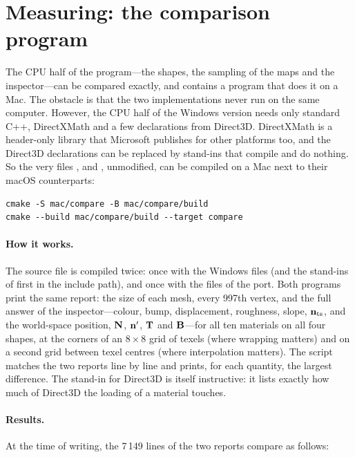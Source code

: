 \section{Measuring: the comparison program}
\label{sec:probe}
The CPU half of the program---the shapes, the sampling of the maps and the inspector---can be
compared exactly, and  contains a program that does it on a Mac. The obstacle
is that the two implementations never run on the same computer. However, the CPU half of the
Windows version needs only standard C++, DirectXMath and a few declarations from Direct3D.
DirectXMath is a header-only library that Microsoft publishes for other platforms too, and the
Direct3D declarations can be replaced by stand-ins that compile and do nothing. So the very files
,  and , unmodified, can be
compiled on a Mac next to their macOS counterparts:
\begin{lstlisting}[language={},numbers=none,frame=none,basicstyle=\ttfamily\small]
cmake -S mac/compare -B mac/compare/build
cmake --build mac/compare/build --target compare
\end{lstlisting}

\paragraph{How it works.} The source file  is compiled twice: once with the
Windows files (and the stand-ins of  first in the include path), and once
with the files of the port. Both programs print the same report: the size of each mesh, every
997th vertex, and the full answer of the inspector---colour, bump, displacement, roughness,
slope, $\mathbf{n}_{\mathrm{ts}}$, and the world-space position, $\mathbf{N}$, $\mathbf{n}'$, $\mathbf{T}$ and $\mathbf{B}$---for all ten
materials on all four shapes, at the corners of an $8\times8$ grid of texels (where wrapping
matters) and on a second grid between texel centres (where interpolation matters). The script
 matches the two reports line by line and prints, for each quantity, the largest
difference. The stand-in for Direct3D is itself instructive: it lists exactly how much of
Direct3D the loading of a material touches.


\paragraph{Results.} At the time of writing, the 7\,149 lines of the two reports compare as
follows:

